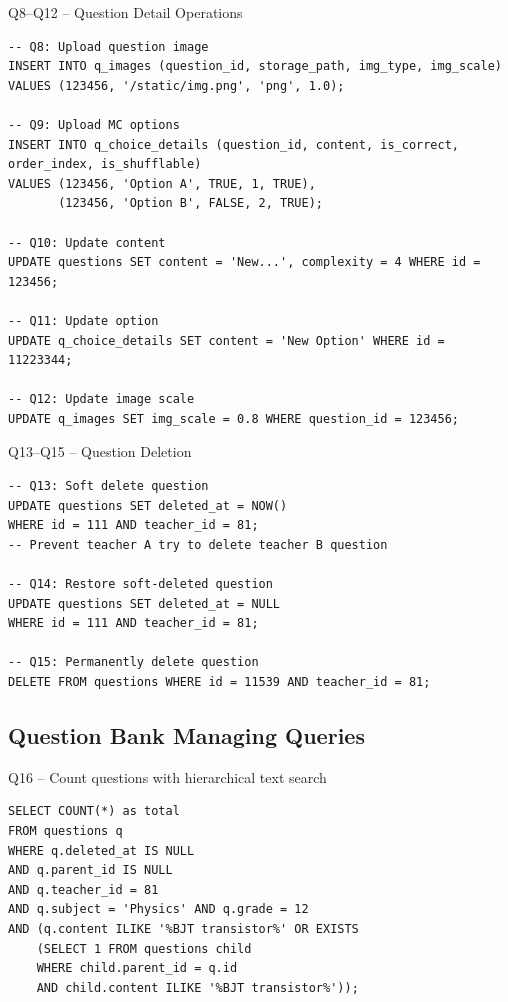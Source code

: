 \documentclass[aspectratio=169, 10pt]{beamer}
\begin{document}
\begin{frame}[fragile]{Q8--Q12 -- Question Detail Operations}
    \begin{lstlisting}
-- Q8: Upload question image
INSERT INTO q_images (question_id, storage_path, img_type, img_scale) 
VALUES (123456, '/static/img.png', 'png', 1.0);

-- Q9: Upload MC options
INSERT INTO q_choice_details (question_id, content, is_correct, order_index, is_shufflable) 
VALUES (123456, 'Option A', TRUE, 1, TRUE),
       (123456, 'Option B', FALSE, 2, TRUE);

-- Q10: Update content
UPDATE questions SET content = 'New...', complexity = 4 WHERE id = 123456;

-- Q11: Update option
UPDATE q_choice_details SET content = 'New Option' WHERE id = 11223344;

-- Q12: Update image scale
UPDATE q_images SET img_scale = 0.8 WHERE question_id = 123456;
    \end{lstlisting}
\end{frame}


\begin{frame}[fragile]{Q13--Q15 -- Question Deletion}
    \begin{lstlisting}
-- Q13: Soft delete question
UPDATE questions SET deleted_at = NOW() 
WHERE id = 111 AND teacher_id = 81; 
-- Prevent teacher A try to delete teacher B question

-- Q14: Restore soft-deleted question
UPDATE questions SET deleted_at = NULL 
WHERE id = 111 AND teacher_id = 81;

-- Q15: Permanently delete question
DELETE FROM questions WHERE id = 11539 AND teacher_id = 81;
    \end{lstlisting}
\end{frame}


\subsection{Question Bank Managing Queries}

\begin{frame}[fragile]{Q16 -- Count questions with hierarchical text search}
    \begin{lstlisting}
SELECT COUNT(*) as total 
FROM questions q 
WHERE q.deleted_at IS NULL 
AND q.parent_id IS NULL 
AND q.teacher_id = 81 
AND q.subject = 'Physics' AND q.grade = 12 
AND (q.content ILIKE '%BJT transistor%' OR EXISTS 
    (SELECT 1 FROM questions child 
    WHERE child.parent_id = q.id 
    AND child.content ILIKE '%BJT transistor%'));
    \end{lstlisting}
\end{frame}
\end{document}
